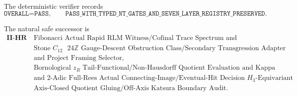 \documentclass[10pt,a4paper]{article}
\newcommand{\Z}{\mathbb Z}
\begin{document}
The deterministic verifier records
\[
\boxed{\texttt{OVERALL=PASS},\qquad
\texttt{PASS\_WITH\_TYPED\_NT\_GATES\_AND\_SEVEN\_LAYER\_REGISTRY\_PRESERVED}.}
\tag{22}
\]

The natural safe successor is
\[
\boxed{\begin{aligned}
\textbf{II-HR -- }&\text{Fibonacci Actual Rapid RLM Witness/Cofinal Trace Spectrum and Enriched Hadamardization Decision,}\\
&\text{Stone }C_{12}\text{ }24\Z\text{ Gauge-Descent Obstruction Class/Secondary Transgression Adapter}\\
&\text{and Project Framing Selector,}\\
&\text{Bornological }z_R\text{ Tail-Functional/Non-Hausdorff Quotient Evaluation and Kappa Value,}\\
&\text{and 2-Adic Full-Rees Actual Connecting-Image/Eventual-Hit Decision plus }H_3\text{-Equivariant}\\
&\text{Axis-Closed Quotient Gluing/Off-Axis Katsura Boundary Audit.}
\end{aligned}}
\tag{23}
\]
\end{document}
